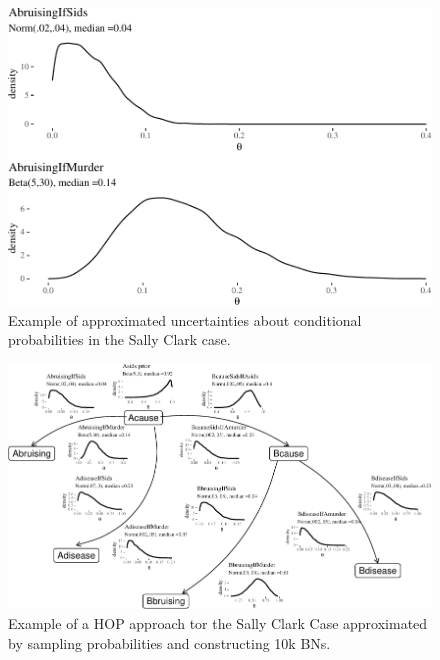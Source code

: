 \documentclass[
  10pt,
  dvipsnames,enabledeprecatedfontcommands]{scrartcl}
\begin{document}
\begin{figure}[H]

\begin{center}\includegraphics[width=0.9\linewidth]{chapter-outline_files/figure-latex/fig:SCwithHOPa-1} \end{center}
\caption{Example of approximated uncertainties about conditional probabilities in the Sally Clark case.}
\label{fig:SCwithHOPa}
\end{figure}

\begin{figure}[H]

\begin{center}\includegraphics[width=1.6\linewidth,height=2\textheight,angle=90]{chapter-outline_files/figure-latex/SCwithHOP-1} \end{center}

\caption{Example of a HOP approach tor the Sally Clark Case  approximated by sampling probabilities  and constructing 10k BNs.}
\label{fig:SCwithHOP}
\end{figure}
\end{document}
